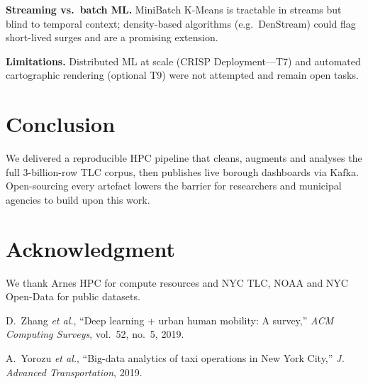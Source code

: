 \documentclass[conference]{IEEEtran}
\begin{document}
  \textbf{Streaming vs.\ batch ML.}
  MiniBatch K-Means is tractable in streams but blind to temporal
  context; density-based algorithms (e.g.\ DenStream) could flag
  short-lived surges and are a promising extension.

  \textbf{Limitations.}
  Distributed ML at scale (CRISP Deployment—T7) and automated
  cartographic rendering (optional T9) were not attempted and remain open
  tasks.

  \section{Conclusion}\label{sec:conclusion}
  We delivered a reproducible HPC pipeline that cleans, augments and
  analyses the full 3-billion-row TLC corpus, then publishes live borough
  dashboards via Kafka.  Open-sourcing every artefact lowers the barrier
  for researchers and municipal agencies to build upon this work.

  \section*{Acknowledgment}
  We thank Arnes HPC for compute resources and NYC TLC, NOAA and NYC Open-Data
  for public datasets.

  
  \begin{thebibliography}{00}

    D.~Zhang \emph{et al.}, “Deep learning + urban human mobility: A survey,”
    \emph{ACM Computing Surveys}, vol.~52, no.~5, 2019.

    A.~Yorozu \emph{et al.}, “Big-data analytics of taxi operations in New York
    City,” \emph{J. Advanced Transportation}, 2019.


  \end{thebibliography}

  
\end{document}
